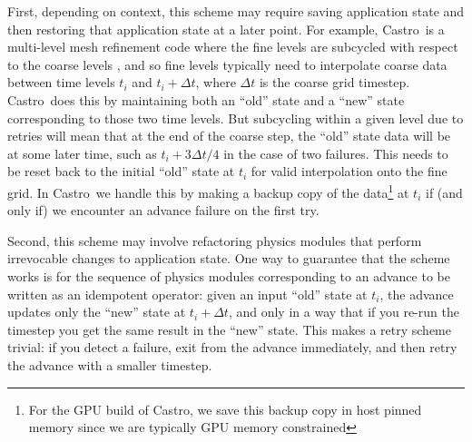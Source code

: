 \documentclass[times,modern]{elsarticle}
\newcommand{\castro}{{\sf Castro}}
\begin{document}
First, depending on context, this scheme may require saving application state and then restoring that application
state at a later point. For example, \castro\ is a multi-level mesh refinement code where the fine levels are
subcycled with respect to the coarse levels \citep{castro,berger_colella}, and so fine levels typically need to
interpolate coarse data between time levels $t_{i}$ and $t_{i} + \Delta t$, where $\Delta t$ is the coarse grid
timestep. \castro\ does this by maintaining both an ``old'' state and a ``new'' state corresponding to those two
time levels. But subcycling within a given level due to retries will mean that at the end of the coarse step, the
``old'' state data will be at some later time, such as $t_{i} + 3\Delta t / 4$ in the case of two failures. This
needs to be reset back to the initial ``old'' state at $t_{i}$ for valid interpolation onto the fine grid. In \castro\
we handle this by making a backup copy of the data\footnote{For the GPU build of \castro, we save this backup copy
in host pinned memory since we are typically GPU memory constrained} at $t_{i}$ if (and only if) we encounter an
advance failure on the first try.

Second, this scheme may involve refactoring physics modules that perform irrevocable changes to application
state. One way to guarantee that the scheme works is for the sequence of physics modules corresponding to an
advance to be written as an idempotent operator: given an input ``old'' state at $t_{i}$, the advance updates
only the ``new'' state at $t_{i} + \Delta t$, and only in a way that if you re-run the timestep you get the same
result in the ``new'' state. This makes a retry scheme trivial: if you detect a failure, exit from the advance
immediately, and then retry the advance with a smaller timestep.




\end{document}
